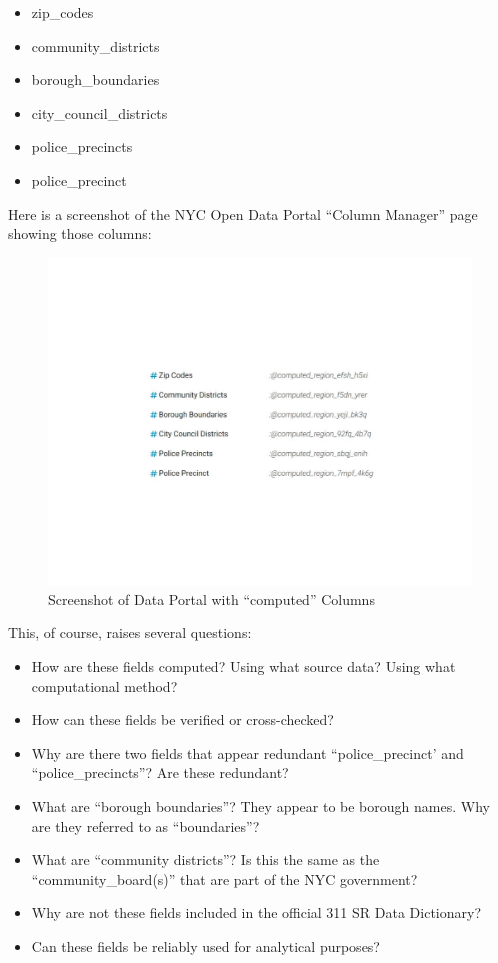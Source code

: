 \documentclass[12pt, titlepage]{article}
\begin{document}
\begin{itemize}
	\item zip\_codes
	\item community\_districts
	\item borough\_boundaries
	\item city\_council\_districts
	\item police\_precincts
	\item police\_precinct 
\end{itemize}	

Here is a screenshot of the NYC Open Data Portal ``Column Manager'' page showing those columns:

\begin{figure}[tbp]
  \centering
 	\includegraphics[width = \textwidth] {computed_fields.pdf}	
	\caption{Screenshot of Data Portal with ``computed'' Columns}  
	\label{fig:computed-columns}
\end{figure}

This, of course, raises several questions:

\begin{itemize}
	\item How are these fields computed? Using what source data? Using what computational method?
	\item How can these fields be verified or cross-checked?
	\item Why are there two fields that appear redundant ``police\_precinct' and ``police\_precincts''? Are these redundant?
	\item What are ``borough boundaries''? They appear to be borough names. Why are they referred to as ``boundaries''?
	\item What are ``community districts''? Is this the same as the ``community\_board(s)'' that are part of the NYC government?
	\item Why are not these fields included in the official 311 SR Data Dictionary?
	\item Can these fields be reliably used for analytical purposes? 
\end{itemize}	
\end{document}
